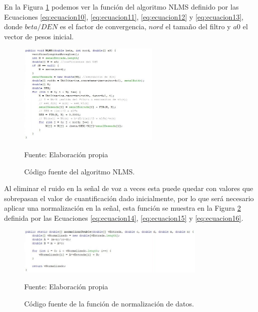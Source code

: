 \begin{enumerate}
En la Figura \ref{fig:figura3.8} podemos ver la función del algoritmo NLMS definido por las Ecuaciones \eqref{eq:ecuacion10}, \eqref{eq:ecuacion11}, \eqref{eq:ecuacion12} y \eqref{eq:ecuacion13}, donde $beta/DEN$ es el factor de convergencia, $nord$ el tamaño del filtro y $a0$ el vector de pesos inicial.
\begin{figure}[H]
\captionsetup{justification=centering}
\begin{center}
\includegraphics[width=0.6\textwidth]{Imagenes/Cap3/image008}
\end{center}
\begin{center}
\vskip -0.5cm
\caption{\small{Código fuente del algoritmo NLMS.}}
\label{fig:figura3.8}
{\small{Fuente: Elaboración propia}}
\end{center}
\end{figure}

Al eliminar el ruido en la señal de voz a veces esta puede quedar con valores que sobrepasan el valor de cuantificación dado inicialmente, por lo que será necesario aplicar una normalización en la señal, esta función se muestra en la Figura \ref{fig:figura3.9} definida por las Ecuaciones \eqref{eq:ecuacion14}, \eqref{eq:ecuacion15} y \eqref{eq:ecuacion16}.
\begin{figure}[H]
\captionsetup{justification=centering}
\begin{center}
\includegraphics[width=0.8\textwidth]{Imagenes/Cap3/image009}
\end{center}
\begin{center}
\vskip -0.5cm
\caption{\small{Código fuente de la función de normalización de datos.}}
\label{fig:figura3.9}
{\small{Fuente: Elaboración propia}}
\end{center}
\end{figure}


\end{enumerate}
